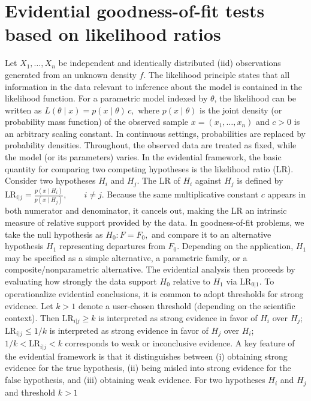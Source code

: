 \documentclass[twoside]{article}
\begin{document}
\section{Evidential goodness-of-fit tests based on likelihood ratios}
Let \(X_1,\ldots,X_n\) be independent and identically distributed (iid) observations generated from an unknown density \(f\). The likelihood principle states that all information in the data relevant to inference about the model is contained in the likelihood function. For a parametric model indexed by \(\theta\), the likelihood can be written as
$
L(\theta \mid x)=p(x\mid \theta)\,c,
$
where \(p(x\mid \theta)\) is the joint density (or probability mass function) of the observed sample \(x=(x_1,\ldots,x_n)\) and \(c>0\) is an arbitrary scaling constant. In continuous settings, probabilities are replaced by probability densities. Throughout, the observed data are treated as fixed, while the model (or its parameters) varies.
In the evidential framework, the basic quantity for comparing two competing hypotheses is the likelihood ratio (LR). Consider two hypotheses \(H_i\) and \(H_j\). The LR of \(H_i\) against \(H_j\) is defined by
$
\mathrm{LR}_{i|j}=\frac{p(x\mid H_i)}{p(x\mid H_j)}, \qquad i\neq j .
$
Because the same multiplicative constant \(c\) appears in both numerator and denominator, it cancels out, making the LR an intrinsic measure of relative support provided by the data.
In goodness-of-fit problems, we take the null hypothesis as
$
H_0: F=F_0,
$
and compare it to an alternative hypothesis \(H_1\) representing departures from \(F_0\). Depending on the application, \(H_1\) may be specified as a simple alternative, a parametric family, or a composite/nonparametric alternative. The evidential analysis then proceeds by evaluating how strongly the data support \(H_0\) relative to \(H_1\) via \(\mathrm{LR}_{0|1}\).
To operationalize evidential conclusions, it is common to adopt thresholds for strong evidence. Let \(k>1\) denote a user-chosen threshold (depending on the scientific context). Then
 \(\mathrm{LR}_{i|j}\ge k\) is interpreted as strong evidence in favor of \(H_i\) over \(H_j\);
 \(\mathrm{LR}_{i|j}\le 1/k\) is interpreted as strong evidence in favor of \(H_j\) over \(H_i\);
 \(1/k<\mathrm{LR}_{i|j}<k\) corresponds to weak or inconclusive evidence.
A key feature of the evidential framework is that it distinguishes between (i) obtaining strong evidence for the true hypothesis, (ii) being misled into strong evidence for the false hypothesis, and (iii) obtaining weak evidence. For two hypotheses \(H_i\) and \(H_j\) and threshold \(k>1\)
\end{document}
